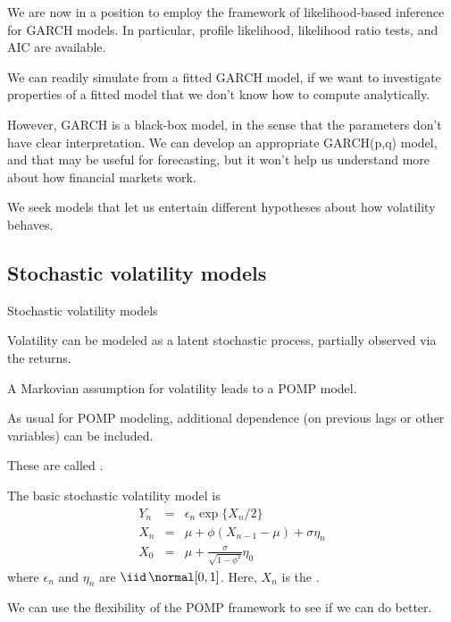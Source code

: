 \begin{frame}[fragile]

\bi

\item We are now in a position to employ the framework of likelihood-based inference for GARCH models. In particular, profile likelihood, likelihood ratio tests, and AIC are available.

\item We can readily simulate from a fitted GARCH model, if we want to investigate properties of a fitted model that we don't know how to compute analytically.

\item However, GARCH is a black-box model, in the sense that the parameters don't have clear interpretation. We can develop an appropriate GARCH(p,q) model, and that may be useful for forecasting, but it won't help us understand more about how financial markets work. 

\item We seek models that let us entertain different hypotheses about how volatility behaves.

\ei

\end{frame}

\subsection{Stochastic volatility models}

\begin{frame}{Stochastic volatility models}

\bi
\item Volatility can be modeled as a latent stochastic process, partially observed via the returns.
\item A Markovian assumption for volatility leads to a POMP model.
\item As usual for POMP modeling, additional dependence (on previous lags or other variables) can be included.
\item These are called .
\item The basic stochastic volatility model \citep{kastner16} is
\begin{eqnarray}
Y_n &=& \epsilon_n \exp\{X_n/2\}\\
X_n &=& \mu + \phi(X_{n-1}-\mu) + \sigma \eta_n \\
X_0 &=& \mu + \frac{\sigma}{\sqrt{1-\phi^2}} \eta_0
\end{eqnarray}
where $\epsilon_n$ and $\eta_n$ are ${\mathrm{\iid}}\, {\normal}[0,1]$.
Here, $X_n$ is the .
\item We can use the flexibility of the POMP framework to see if we can do better.
\ei
\end{frame}

